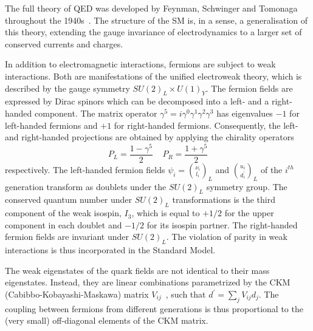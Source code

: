The full theory of QED was developed by Feynman, Schwinger and Tomonaga throughout the 1940s~\cite{PhysRev.75.486}.  The structure of the SM is, in a sense, a generalisation of this theory, extending the gauge invariance of electrodynamics to a larger set of conserved currents and charges. 

In addition to electromagnetic interactions, fermions are subject to weak interactions. Both are manifestations of the unified electroweak theory, which is described by the gauge symmetry $SU(2)_L \times U(1)_Y$. The fermion fields are expressed by Dirac spinors which can be decomposed into a left- and a right-handed component. The matrix operator $\gamma^5 = i \gamma^0 \gamma^1 \gamma^2 \gamma^3$ has eigenvalues $-1$ for left-handed fermions and $+1$ for right-handed fermions. Consequently, the left- and right-handed projections are obtained by applying the chirality operators
%
\begin{equation}
P_L = \frac{1-\gamma^5}{2} \; \; \; \; P_R = \frac{1+\gamma^5}{2} 
\end{equation}
%
respectively. The left-handed fermion fields $\psi_i= \binom{\nu_i}{l_i}_L$ and $\binom{u_i}{d^{\prime}_i}_L$ of the $i^{th}$ generation transform as doublets under the $SU(2)_L$ symmetry group. The conserved quantum number under  $SU(2)_L$ transformations is the third component of the weak isospin, $I_3$, which is equal to $+1/2$ for the upper component in each doublet and $-1/2$ for its isospin partner. The right-handed fermion fields are invariant under $SU(2)_L$. The violation of parity in weak interactions is thus incorporated in the Standard Model.

The weak eigenstates of the quark fields are not identical to their mass eigenstates. Instead, they are linear combinations parametrized by the CKM (Cabibbo-Kobayashi-Maskawa) matrix $V_{ij}$~\cite{CKM}, such that $d^{\prime} = \sum_j V_{ij} d_j$.  The coupling between fermions from different generations is thus proportional to the (very small) off-diagonal elements of the CKM matrix.

